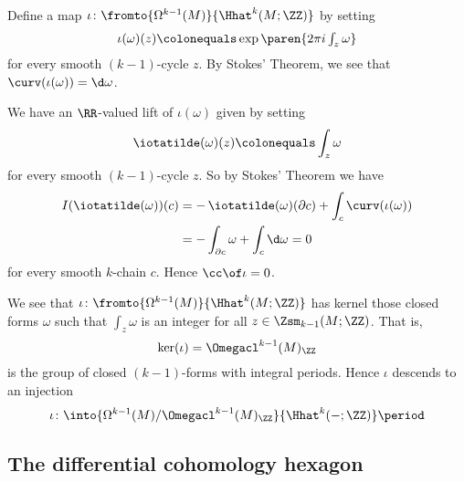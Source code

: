 \begin{construction}
	Define a map $ \iota \colon \fromto{\Omega^{k-1}(M)}{\Hhat^k(M;\ZZ)} $ by setting
	\begin{equation*}
		\iota(\omega)(z) \colonequals \exp\paren{\textstyle 2\pi i \int_z \omega} 
	\end{equation*}
	for every smooth $ (k-1) $-cycle $ z $.
	By Stokes' Theorem, we see that $ \curv(\iota(\omega)) = \d\omega $.

	We have an $ \RR $-valued lift of $ \iota(\omega) $ given by setting
	\begin{equation*}
		\iotatilde(\omega)(z) \colonequals \int_z \omega
	\end{equation*}
	for every smooth $ (k-1) $-cycle $ z $.
	So by Stokes' Theorem we have
	\begin{align*}
		I(\iotatilde(\omega))(c) &= -\,\iotatilde(\omega)(\partial c) + \int_c \curv(\iota(\omega)) \\ 
		&= -\int_{\partial c} \omega + \int_{c} \d\omega = 0
	\end{align*}
	for every smooth $ k $-chain $ c $.
	Hence $ \cc \of \iota = 0 $.

	We see that $ \iota \colon \fromto{\Omega^{k-1}(M)}{\Hhat^k(M;\ZZ)} $ has kernel those closed forms $ \omega $ such that $ \int_{z} \omega $ is an integer for all $ z \in \Zsm_{k-1}(M;\ZZ) $. 
	That is,
	\begin{equation*}
		\ker(\iota) = \Omegacl^{k-1}(M)_{\ZZ}
	\end{equation*}
	is the group of closed $ (k-1) $-forms with integral periods.
	Hence $ \iota $ descends to an injection
	\begin{equation*}
		\iota \colon \into{\Omega^{k-1}(M)/\Omegacl^{k-1}(M)_{\ZZ}}{\Hhat^{k}(-;\ZZ)} \period
	\end{equation*}
\end{construction}


\subsection{The differential cohomology hexagon}


